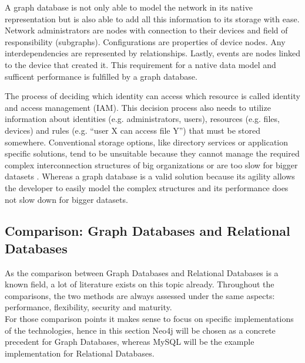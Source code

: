 A graph database is not only able to model the network in its native representation but is also able to add all this information to its storage with ease. Network administrators are nodes with connection to their devices and field of responsibility (subgraphs). Configurations are properties of device nodes. Any interdependencies are represented by relationships. Lastly, events are nodes linked to the device that created it. This requirement for a native data model and sufficent performance is fulfilled by a graph database.


The process of deciding which identity can access which resource is called identity and access management (IAM). This decision process also needs to utilize information about identities (e.g.  administrators, users), resources (e.g.  files, devices) and rules (e.g. “user X can access file Y”) that must be stored somewhere. Conventional storage options, like directory services or application specific solutions, tend to be unsuitable because they cannot manage the required complex interconnection structures of big organizations or are too slow for bigger datasets \autocite{neo4j:use_cases}.  Whereas a graph database is a valid solution because its agility allows the developer to easily model the complex structures and its performance does not slow down for bigger datasets.


\subsection{Comparison: Graph Databases and Relational Databases} \label{section:comparison}
As the comparison between Graph Databases and Relational Databases is a known field, a lot of literature exists on this topic already. Throughout the comparisons, the two methods are always assessed under the same aspects: performance, flexibility, security and maturity. \\
For those comparison points it makes sense to focus on specific implementations of the technologies, hence in this section Neo4j will be chosen as a concrete precedent for Graph Databases, whereas MySQL will be the example implementation for Relational Databases.

